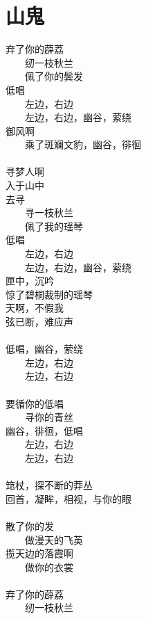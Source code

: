 \chapter[山鬼]{山\qquad 鬼}

\leftskip=25mm
\noindent
弃了你的薜荔 \\
　　纫一枝秋兰 \\
　　佩了你的鬓发　\\
低唱 \\
　　左边，右边 \\
　　左边，右边，幽谷，萦绕 \\
御风啊 \\
　　乘了斑斓文豹，幽谷，徘徊 \\
\\
寻梦人啊 \\
入于山中 \\
去寻 \\
　　寻一枝秋兰 \\
　　佩了我的瑶琴 \\
低唱 \\
　　左边，右边 \\
　　左边，右边，幽谷，萦绕 \\
匣中，沉吟 \\
惊了碧桐裁制的瑶琴 \\
天啊，不假我 \\
弦已断，难应声 \\
\\
低唱，幽谷，萦绕 \\
　　左边，右边 \\
　　左边，右边 \\
\\
要循你的低唱 \\
　　寻你的青丝 \\
幽谷，徘徊，低唱 \\
　　左边，右边 \\
　　左边，右边 \\
\\
筇杖，探不断的莽丛 \\
回首，凝眸，相视，与你的眼 \\
\\
散了你的发 \\
　　做漫天的飞英 \\
揽天边的落霞啊 \\
　　做你的衣裳 \\
\\
弃了你的薜荔 \\
　　纫一枝秋兰 \\
